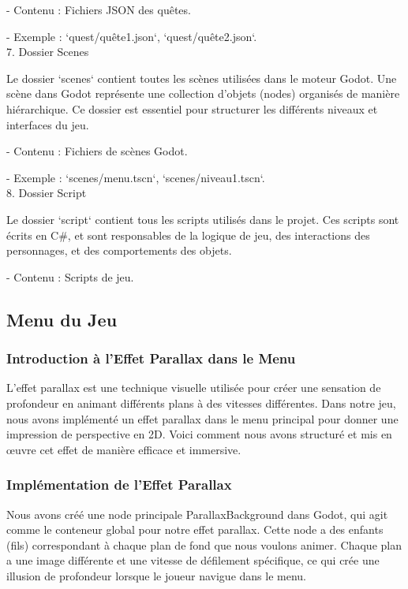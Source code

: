    - Contenu : Fichiers JSON des quêtes.

   - Exemple : `quest/quête1.json`, `quest/quête2.json`.
\\

7. Dossier Scenes

   Le dossier `scenes` contient toutes les scènes utilisées dans le moteur Godot. Une scène dans Godot représente une collection d'objets (nodes) organisés de manière hiérarchique. Ce dossier est essentiel pour structurer les différents niveaux et interfaces du jeu.

   - Contenu : Fichiers de scènes Godot.

   - Exemple : `scenes/menu.tscn`, `scenes/niveau1.tscn`.
\\

8. Dossier Script

   Le dossier `script` contient tous les scripts utilisés dans le projet. Ces scripts sont écrits en C\#, et sont responsables de la logique de jeu, des interactions des personnages, et des comportements des objets.

   - Contenu : Scripts de jeu.


      \subsection{Menu du Jeu }


      \subsubsection*{Introduction à l'Effet Parallax dans le Menu}
      L'effet parallax est une technique visuelle utilisée pour créer une sensation de profondeur en animant différents plans à des vitesses différentes.
      Dans notre jeu, nous avons implémenté un effet parallax dans le menu principal pour donner une impression de perspective en 2D. 
      Voici comment nous avons structuré et mis en œuvre cet effet de manière efficace et immersive.
      \\

      \subsubsection*{Implémentation de l'Effet Parallax}
      Nous avons créé une node principale ParallaxBackground dans Godot, qui agit comme le conteneur global pour notre effet parallax.
      Cette node a des enfants (fils) correspondant à chaque plan de fond que nous voulons animer. Chaque plan a une image différente et une
      vitesse de défilement spécifique, ce qui crée une illusion de profondeur lorsque le joueur navigue dans le menu.
      \\


